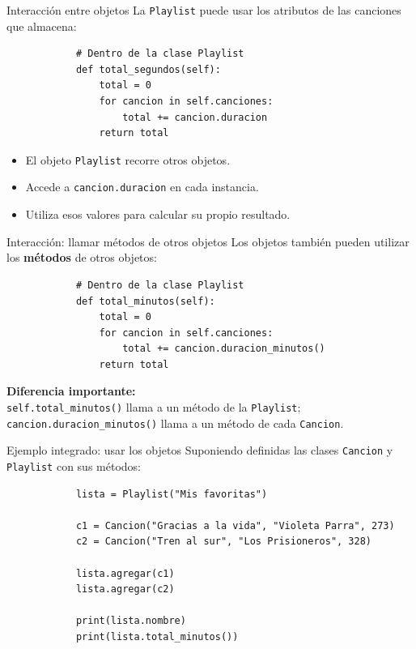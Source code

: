 \documentclass{beamer}
\begin{document}
    \begin{frame}[fragile,t]{Interacción entre objetos}
        La \texttt{Playlist} puede usar los atributos de las canciones que almacena:
        \begin{verbatim}
            # Dentro de la clase Playlist
            def total_segundos(self):
                total = 0
                for cancion in self.canciones:
                    total += cancion.duracion
                return total
        \end{verbatim}
        \pause
        \begin{itemize}
            \item El objeto \texttt{Playlist} recorre otros objetos.
            \item Accede a \texttt{cancion.duracion} en cada instancia.
            \item Utiliza esos valores para calcular su propio resultado.
        \end{itemize}
    \end{frame}
    
    \begin{frame}[fragile,t]{Interacción: llamar métodos de otros objetos}
        Los objetos también pueden utilizar los \textbf{métodos} de otros objetos:
        \begin{verbatim}
            # Dentro de la clase Playlist
            def total_minutos(self):
                total = 0
                for cancion in self.canciones:
                    total += cancion.duracion_minutos()
                return total
                \end{verbatim}
        \pause
        \textbf{Diferencia importante:}\\
        \texttt{self.total_minutos()} llama a un método de la \texttt{Playlist};\\
        \texttt{cancion.duracion_minutos()} llama a un método de cada \texttt{Cancion}.
    \end{frame}
    
    \begin{frame}[fragile,t]{Ejemplo integrado: usar los objetos}
        Suponiendo definidas las clases \texttt{Cancion} y \texttt{Playlist} con sus métodos:
        \begin{verbatim}
            lista = Playlist("Mis favoritas")
            
            c1 = Cancion("Gracias a la vida", "Violeta Parra", 273)
            c2 = Cancion("Tren al sur", "Los Prisioneros", 328)
            
            lista.agregar(c1)
            lista.agregar(c2)
            
            print(lista.nombre)
            print(lista.total_minutos())
        \end{verbatim}
    \end{frame}
    
\end{document}
